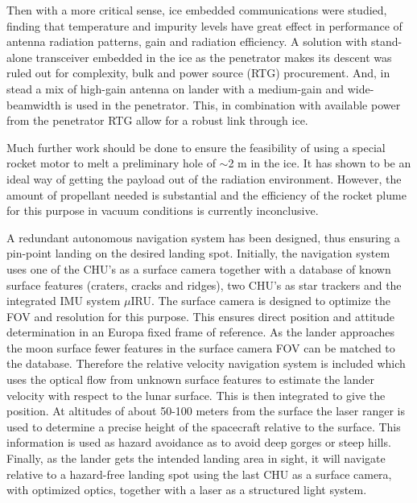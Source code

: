 \noindent
Then with a more critical sense, ice embedded communications were studied, finding that temperature and impurity levels have great effect in performance of antenna radiation patterns, gain and radiation efficiency. A solution with stand-alone transceiver embedded in the ice as the penetrator makes its descent was ruled out for complexity, bulk and power source (RTG) procurement. And, in stead a mix of high-gain antenna on lander with a medium-gain and wide-beamwidth is used in the penetrator. This, in combination with available power from the penetrator RTG allow for a robust link through ice.

Much further work should be done to ensure the feasibility of using a special rocket motor to melt a preliminary hole of $\sim$2 m in the ice. It has shown to be an ideal way of getting the payload out of the radiation environment. However, the amount of propellant needed is substantial and the efficiency of the rocket plume for this purpose in vacuum conditions is currently inconclusive.

A redundant autonomous navigation system has been designed, thus ensuring a pin-point landing on the desired landing spot. Initially, the navigation system uses one of the CHU's as a surface camera together with a database of known surface features (craters, cracks and ridges), two CHU's as star trackers and the integrated IMU system $\mu$IRU. The surface camera is designed to optimize the FOV and resolution for this purpose. This ensures direct position and attitude determination in an Europa fixed frame of reference.
As the lander approaches the moon surface fewer features in the surface camera FOV can be matched to the database. Therefore the relative velocity navigation system is included which uses the optical flow from unknown surface features to estimate the lander velocity with respect to the lunar surface. This is then integrated to give the position. At altitudes of about 50-100 meters from the surface the laser ranger is used to determine a precise height of the spacecraft relative to the surface. This information is used as hazard avoidance as to avoid deep gorges or steep hills. Finally, as the lander gets the intended landing area in sight, it will navigate relative to a hazard-free landing spot using the last CHU as a surface camera, with optimized optics, together with a laser as a structured light system. 

